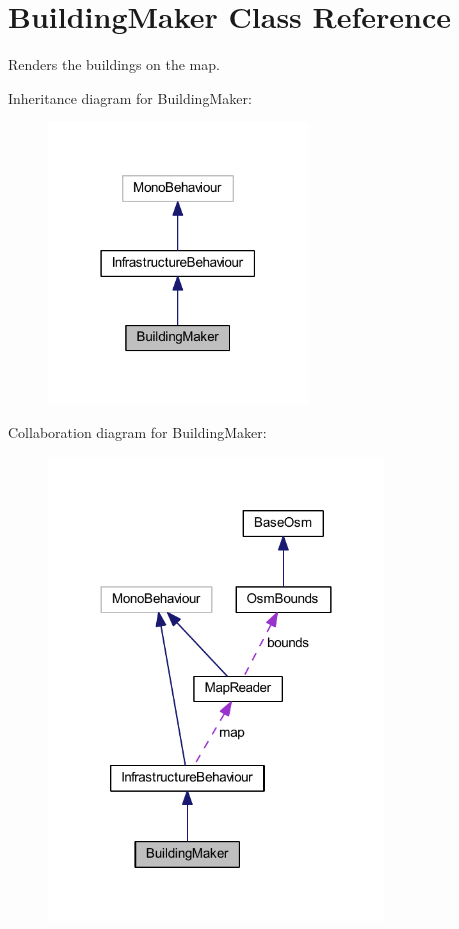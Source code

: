 \hypertarget{class_building_maker}{}\section{Building\+Maker Class Reference}
\label{class_building_maker}


Renders the buildings on the map.  




Inheritance diagram for Building\+Maker\+:\nopagebreak
\begin{figure}[H]
\begin{center}
\leavevmode
\includegraphics[width=195pt]{class_building_maker__inherit__graph}
\end{center}
\end{figure}


Collaboration diagram for Building\+Maker\+:\nopagebreak
\begin{figure}[H]
\begin{center}
\leavevmode
\includegraphics[width=252pt]{class_building_maker__coll__graph}
\end{center}
\end{figure}
